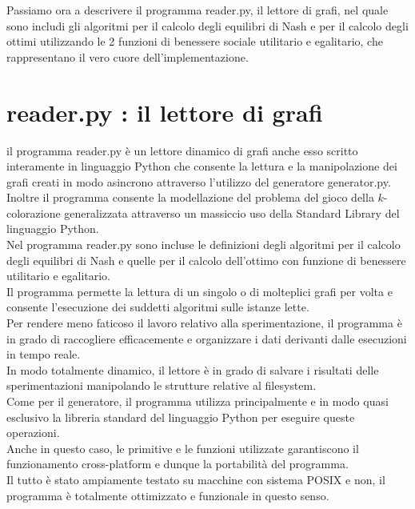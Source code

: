 Passiamo ora a descrivere il programma reader.py, il lettore di grafi, nel quale sono includi gli algoritmi per il calcolo degli equilibri di Nash e per il calcolo degli ottimi utilizzando le 2 funzioni di benessere sociale utilitario e egalitario, che rappresentano il vero cuore dell'implementazione.\\


\section{reader.py : il lettore di grafi}
\justify
il programma reader.py è un lettore dinamico di grafi anche esso scritto interamente in linguaggio Python che consente la lettura e la manipolazione dei grafi creati in modo asincrono attraverso l'utilizzo del generatore generator.py.\\

Inoltre il programma consente la modellazione del problema del gioco della \(k\)-colorazione generalizzata attraverso un massiccio uso della Standard Library del linguaggio Python.\\

Nel programma reader.py sono incluse le definizioni degli algoritmi per il calcolo degli equilibri di Nash e quelle per il calcolo dell'ottimo con funzione di benessere utilitario e egalitario.\\
Il programma permette la lettura di un singolo o di molteplici grafi per volta e consente l'esecuzione dei suddetti algoritmi sulle istanze lette.\\

Per rendere meno faticoso il lavoro relativo alla sperimentazione, il programma è in grado di raccogliere efficacemente e organizzare i dati derivanti dalle esecuzioni in tempo reale.\\

In modo totalmente dinamico, il lettore è in grado di salvare i risultati delle sperimentazioni manipolando le strutture relative al filesystem.\\
Come per il generatore, il programma utilizza principalmente e in modo quasi esclusivo la libreria standard del linguaggio Python per eseguire queste operazioni.\\
Anche in questo caso, le primitive e le funzioni utilizzate garantiscono il funzionamento cross-platform e dunque la portabilità del programma.\\ Il tutto è stato ampiamente testato su macchine con sistema POSIX e non, il programma è totalmente ottimizzato e funzionale in questo senso.\\

